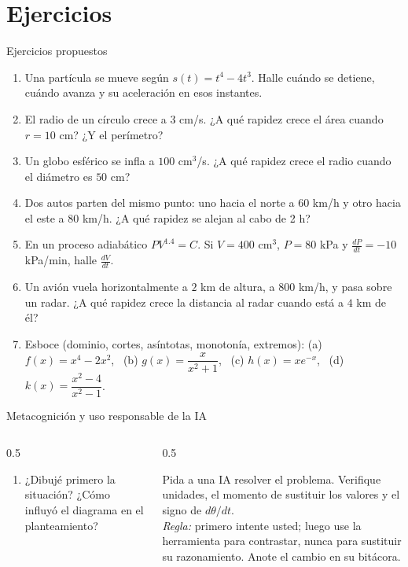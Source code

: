 \documentclass[10pt,aspectratio=169]{beamer}
\begin{document}
\section{Ejercicios}

\begin{frame}{Ejercicios propuestos}
  \small
  \begin{ejercicio}
    \begin{enumerate}
      \item Una partícula se mueve según $s(t)=t^4-4t^3$. Halle cuándo se detiene, cuándo avanza y su aceleración en esos instantes.
      \item El radio de un círculo crece a $3$ cm/s. ¿A qué rapidez crece el área cuando $r=10$ cm? ¿Y el perímetro?
      \item Un globo esférico se infla a $100$ cm$^3$/s. ¿A qué rapidez crece el radio cuando el diámetro es $50$ cm?
      \item Dos autos parten del mismo punto: uno hacia el norte a $60$ km/h y otro hacia el este a $80$ km/h. ¿A qué rapidez se alejan al cabo de 2 h?
      \item En un proceso adiabático $PV^{1.4}=C$. Si $V=400$ cm$^3$, $P=80$ kPa y $\frac{dP}{dt}=-10$ kPa/min, halle $\frac{dV}{dt}$.
      \item Un avión vuela horizontalmente a $2$ km de altura, a $800$ km/h, y pasa sobre un radar. ¿A qué rapidez crece la distancia al radar cuando está a $4$ km de él?
      \item Esboce (dominio, cortes, asíntotas, monotonía, extremos): (a) $f(x)=x^4-2x^2$, \ (b) $g(x)=\dfrac{x}{x^2+1}$, \ (c) $h(x)=xe^{-x}$,
        \ (d) $k(x)=\dfrac{x^2-4}{x^2-1}$.
    \end{enumerate}
  \end{ejercicio}
\end{frame}

\begin{frame}{Metacognición y uso responsable de la IA}
  \small
  \begin{columns}[t]
    \begin{column}{0.5\textwidth}
      \begin{metacog}
        \begin{enumerate}
          \metacomun
          \item ¿Dibujé primero la situación? ¿Cómo influyó el diagrama en el planteamiento?
        \end{enumerate}
      \end{metacog}
    \end{column}
    \begin{column}{0.5\textwidth}
      \begin{iabox}
        Pida a una IA resolver el problema. Verifique unidades, el momento de sustituir los valores y el signo de $d\theta/dt$.\\[2pt]
        \textit{Regla:} primero intente usted; luego use la herramienta para contrastar, nunca para sustituir su razonamiento. Anote el cambio en su bitácora.
      \end{iabox}
    \end{column}
  \end{columns}
\end{frame}
\end{document}
